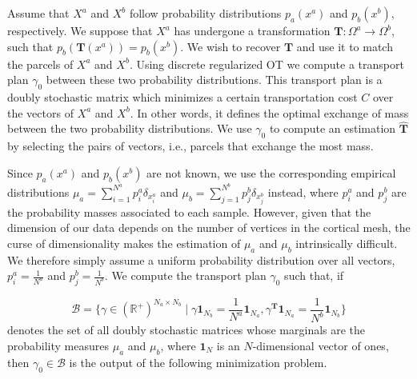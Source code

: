 Assume that $X^a$ and $X^b$ follow probability distributions $p_a(x^a)$ and $p_b(x^b)$, respectively. We suppose that $X^a$ has undergone a transformation $\mathbf{T}:\Omega^a \rightarrow \Omega^b$, such that $p_b(\mathbf{T}(x^a)) = p_b(x^b)$. We wish to recover $\mathbf{T}$ and use it to match the parcels of $X^a$ and $X^b$. Using discrete regularized OT we compute a transport plan $\gamma_0$ between these two probability distributions. This transport plan is a doubly stochastic matrix which minimizes a certain transportation cost $C$ over the vectors of $X^a$ and $X^b$. In other words, it defines the optimal exchange of mass between the two probability distributions. We use $\gamma_0$ to compute an estimation $\hat{\mathbf{T}}$ by selecting the pairs of vectors, i.e., parcels that exchange the most mass. 

Since $p_a(x^a)$ and $p_b(x^b)$ are not known, we use the corresponding empirical distributions $\mu_a = \sum_{i=1}^{N^a} p_i^a\delta_{x^a_i}$ and $\mu_b =\sum_{j=1}^{N^b} p_j^b\delta_{x^b_j}$ instead, where $p_i^a$ and $p_j^b$ are the probability masses associated to each sample. However, given that the dimension of our data depends on the number of vertices in the cortical mesh, the curse of dimensionality makes the estimation of $\mu_a$ and $\mu_b$ intrinsically difficult. We therefore simply assume a uniform probability distribution over all vectors, $p_i^a = \frac{1}{N^a}$ and $p_j^b = \frac{1}{N^b}$. We compute the transport plan $\gamma_0$ such that, if

\begin{equation}
{\mathcal{B} = \big\{ \gamma \in (\mathbb{R}^+)^{N_a\times N_b} \mid \gamma \mathbf{1}_{N_b} = \frac{1}{N^a}\mathbf{1}_{N_a}, \gamma^{\mathbf{T}} \mathbf{1}_{N_a} = \frac{1}{N^b}\mathbf{1}_{N_b}  \big\}}
\end{equation}
denotes the set of all doubly stochastic matrices whose marginals are the probability measures $\mu_a$ and $\mu_b$, where $\mathbf{1}_N$ is an $N$-dimensional vector of ones, then $\gamma_0 \in \mathcal{B}$ is the output of the following minimization problem.


